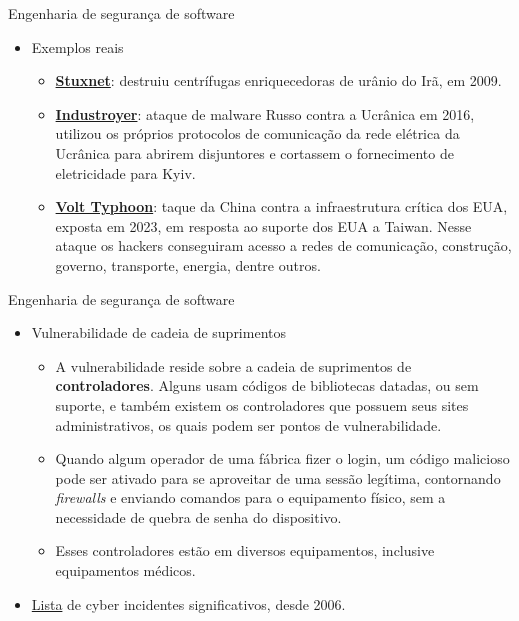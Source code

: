 \documentclass{beamer}
\begin{document}
\begin{frame}{Engenharia de segurança de software}
	\begin{itemize}
		\justifying
		\item Exemplos reais
			\begin{itemize}
				\justifying
				\item \href{https://industrialcyber.co/industrial-cyber-attacks/zetter-details-how-stuxnet-marked-a-turning-point-in-cyberwarfare-by-enabling-physical-sabotage-through-code/}{\textbf{Stuxnet}}: destruiu centrífugas enriquecedoras de urânio do Irã, em 2009.
				\item<2-> \href{https://www.securityweek.com/industroyer-ics-malware-linked-ukraine-power-grid-attack/}{\textbf{Industroyer}}: ataque de malware Russo contra a Ucrânica em 2016, utilizou os próprios protocolos de comunicação da rede elétrica da Ucrânica para abrirem disjuntores e cortassem o fornecimento de eletricidade para Kyiv.
				\item<3> \href{https://www.securityweek.com/china-admitted-to-us-that-it-conducted-volt-typhoon-attacks-report/}{\textbf{Volt Typhoon}}: taque da China contra a infraestrutura crítica dos EUA, exposta em 2023, em resposta ao suporte dos EUA a Taiwan. Nesse ataque os hackers conseguiram acesso a redes de comunicação, construção, governo, transporte, energia, dentre outros.
			\end{itemize}
	\end{itemize}
\end{frame}

\begin{frame}{Engenharia de segurança de software}
	\begin{itemize}
		\justifying
		\item<1> Vulnerabilidade de cadeia de suprimentos
		\begin{itemize}
			\justifying
			\item<1> A vulnerabilidade reside sobre a cadeia de suprimentos de \textbf{controladores}. Alguns usam códigos de bibliotecas datadas, ou sem suporte, e também existem os controladores que possuem seus sites administrativos, os quais podem ser pontos de vulnerabilidade.
			\item<1> Quando algum operador de uma fábrica fizer o login, um código malicioso pode ser ativado para se aproveitar de uma sessão legítima, contornando \textit{firewalls} e enviando comandos para o equipamento físico, sem a necessidade de quebra de senha do dispositivo.
			\item<1> Esses controladores estão em diversos equipamentos, inclusive equipamentos médicos.
		\end{itemize}
		\item<2> \href{https://www.csis.org/programs/strategic-technologies-program/significant-cyber-incidents}{Lista} de cyber incidentes significativos, desde 2006.
	\end{itemize}
\end{frame}
\end{document}
